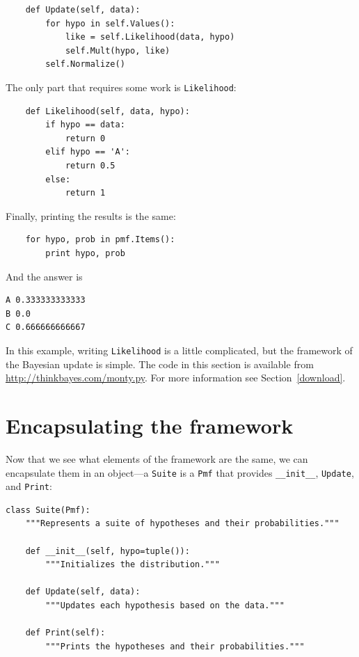\documentclass[12pt]{book}
\begin{document}
\begin{verbatim}
    def Update(self, data):
        for hypo in self.Values():
            like = self.Likelihood(data, hypo)
            self.Mult(hypo, like)
        self.Normalize()
\end{verbatim}

The only part that requires some work is \verb"Likelihood":

\begin{verbatim}
    def Likelihood(self, data, hypo):
        if hypo == data:
            return 0
        elif hypo == 'A':
            return 0.5
        else:
            return 1
\end{verbatim}

Finally, printing the results is the same:

\begin{verbatim}
    for hypo, prob in pmf.Items():
        print hypo, prob
\end{verbatim}

And the answer is

\begin{verbatim}
A 0.333333333333
B 0.0
C 0.666666666667
\end{verbatim}

In this example, writing \verb"Likelihood" is a little complicated,
but the framework of the Bayesian update is simple.  The code in
this section is available from \url{http://thinkbayes.com/monty.py}.
  For more information
see Section~\ref{download}.

\section{Encapsulating the framework}

Now that we see what elements of the framework are the same, we
can encapsulate them in an object---a \verb"Suite" is a \verb"Pmf"
that provides \verb"__init__", \verb"Update", and \verb"Print":

\begin{verbatim}
class Suite(Pmf):
    """Represents a suite of hypotheses and their probabilities."""

    def __init__(self, hypo=tuple()):
        """Initializes the distribution."""

    def Update(self, data):
        """Updates each hypothesis based on the data."""

    def Print(self):
        """Prints the hypotheses and their probabilities."""
\end{verbatim}
\end{document}
